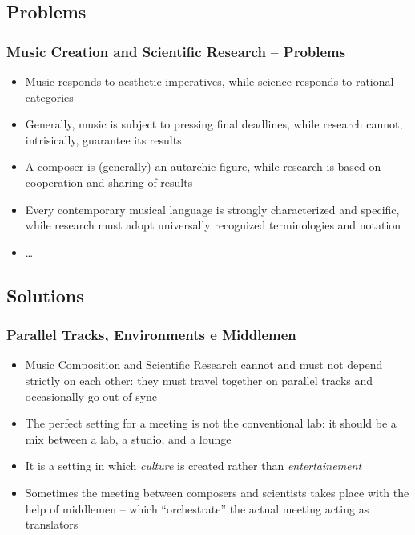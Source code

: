 \subsection{Problems}

\begin{frame}
    \frametitle<+- | alert@+->{Music Creation and Scientific Research -- Problems}

    \begin{itemize}[<+- | alert@+->]
				\item Music responds to aesthetic imperatives, while science responds
								to rational categories
				\item Generally, music is subject to pressing final deadlines,
								while research cannot, intrisically, guarantee its results
				\item A composer is (generally) an autarchic figure, while research is
								based on cooperation and sharing of results
				\item Every contemporary musical language is strongly characterized
								and specific, while research must adopt universally recognized
								terminologies and notation
        \item \ldots
    \end{itemize}

\end{frame}

\subsection{Solutions}

\begin{frame}
    \frametitle<+- | alert@+->{Parallel Tracks, Environments e Middlemen}

    \begin{itemize}[<+- | alert@+->]
				\item Music Composition and Scientific Research cannot and must not
								depend strictly on each other: they must travel together on
								parallel tracks and occasionally go out of sync
				\item The perfect setting for a meeting is not the conventional lab:
								it should be a mix between a lab, a studio, and a lounge
				\item It is a setting in which \emph{culture} is created rather than
								\emph{entertainement}
				\item Sometimes the meeting between composers and scientists takes
								place with the help of middlemen -- which ``orchestrate'' the
								actual meeting acting as translators
    \end{itemize}
    
\end{frame}

